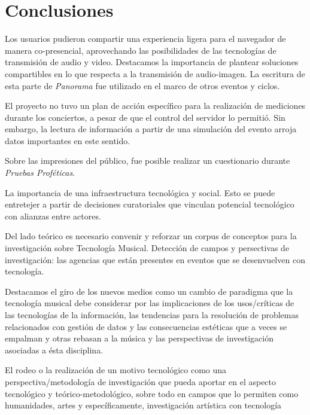 
\section*{Conclusiones}


Los usuarios pudieron compartir una experiencia ligera para el navegador de manera co-presencial, aprovechando las posibilidades de las tecnologías de transmisión de audio y video. Destacamos la importancia de plantear soluciones compartibles en lo que respecta a la transmisión de audio-imagen. La escritura de esta parte de \textit{Panorama} fue utilizado en el marco de otros eventos y ciclos.

El proyecto no tuvo un plan de acción específico para la realización de mediciones durante los conciertos, a pesar de que el control del servidor lo permitió. Sin embargo, la lectura de información a partir de una simulación del evento arroja datos importantes en este sentido.

Sobre las impresiones del público, fue posible realizar un cuestionario durante \textit{Pruebas Proféticas}. 

La importancia de una infraestructura tecnológica y social. Esto se puede entretejer a partir de decisiones curatoriales que vinculan potencial tecnológico con alianzas entre actores. 

Del lado teórico es necesario convenir y reforzar un corpus de conceptos para la investigación sobre Tecnología Musical. Detección de campos y persectivas de investigación: las agencias que están presentes en eventos que se desenvuelven con tecnología.

Destacamos el giro de los nuevos medios como un cambio de paradigma que la tecnología musical debe considerar por las implicaciones de los usos/críticas de las tecnologías de la información, las tendencias para la resolución de problemas relacionados con gestión de datos y las consecuencias estéticas que a veces se empalman y otras rebasan a la música y las perspectivas de investigación asociadas a ésta disciplina. 

El rodeo o la realización de un motivo tecnológico como una perspectiva/metodología de investigación que pueda aportar en el aspecto tecnológico y teórico-metodológico, sobre todo en campos que lo permiten como humanidades, artes y específicamente, investigación artística con tecnología
